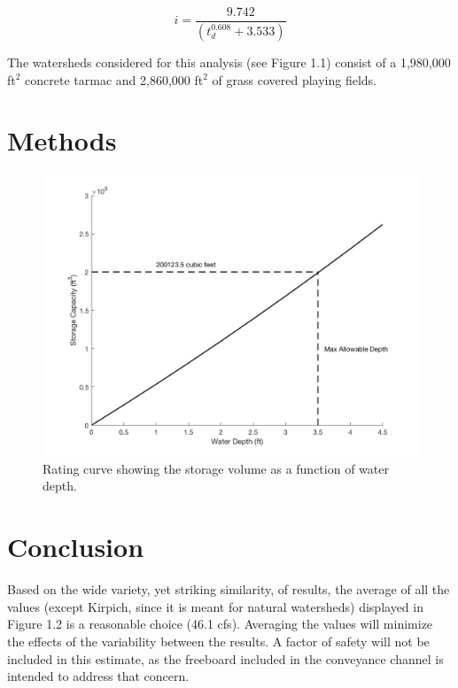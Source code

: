 \documentclass[11pt,letterpaper,final]{report}
\begin{document}
\begin{flushleft}
\begin{equation}
    i=\dfrac{9.742}{\left(t_d^{0.608}+3.533\right)}
\end{equation}

The watersheds considered for this analysis (see Figure 1.1) consist of a 1,980,000 ft$^2$ concrete tarmac and 2,860,000 ft$^2$ of grass covered playing fields. 

\section{Methods}

\begin{figure}[H]
    \centering
    \includegraphics[height=.4\textheight]{RCP.png}

    \caption{Rating curve showing the storage volume as a function of water depth.}
\end{figure}



\section{Conclusion}

Based on the wide variety, yet striking similarity, of results, the average of all the values (except Kirpich, since it is meant for natural watersheds) displayed in Figure 1.2 is a reasonable choice (46.1 cfs). Averaging the values will minimize the effects of the variability between the results. A factor of safety will not be included in this estimate, as the freeboard included in the conveyance channel is intended to address that concern. 




\end{flushleft}
\end{document}
